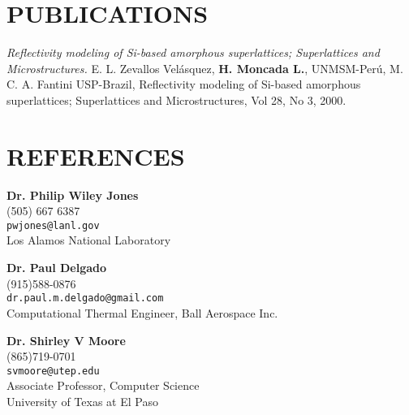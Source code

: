 \documentclass[margin]{res}
\begin{document}
\begin{resume}
\section{PUBLICATIONS}
{\sl Reflectivity modeling of Si-based amorphous superlattices; Superlattices and Microstructures.}
E. L. Zevallos Velásquez,\textbf{ H. Moncada L.}, UNMSM-Perú, M. C. A. Fantini USP-Brazil, Reflectivity modeling of Si-based amorphous superlattices;
Superlattices and Microstructures, Vol 28, No 3, 2000.


\section{REFERENCES}
{\bf Dr. Philip Wiley Jones} \\
(505) 667 6387\\
\verb+pwjones@lanl.gov+\\
Los Alamos National Laboratory

{\bf Dr. Paul Delgado} \\
(915)588-0876\\
\verb+dr.paul.m.delgado@gmail.com+\\
Computational Thermal Engineer,
Ball Aerospace Inc.

{\bf Dr. Shirley V Moore}\\
(865)719-0701\\
\verb+svmoore@utep.edu+\\
Associate Professor, Computer Science\\
University of Texas at El Paso
% 
% 

\end{resume}
\end{document}
